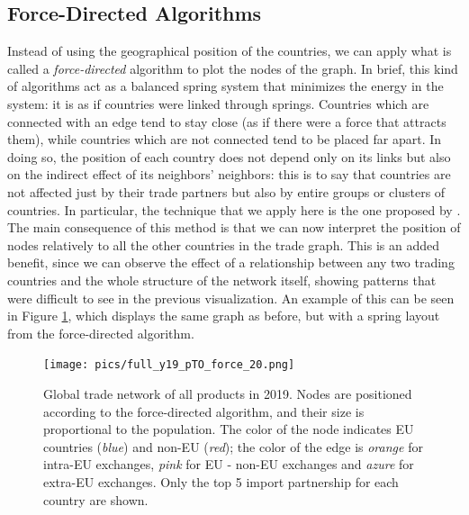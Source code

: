 \subsection{Force-Directed Algorithms}
Instead of using the geographical position of the countries, we can apply what is called a \textit{force-directed} algorithm to plot the nodes of the graph. In brief, this kind of algorithms act as a balanced spring system that minimizes the energy in the system: it is as if countries were linked through springs. Countries which are connected with an edge tend to stay close (as if there were a force that attracts them), while countries which are not connected tend to be placed far apart. In doing so, the position of each country does not depend only on its links but also on the indirect effect of its neighbors' neighbors: this is to say that countries are not affected just by their trade partners but also by entire groups or clusters of countries. In particular, the technique that we apply here is the one proposed by \textcite{fruchterman1991graph}.
The main consequence of this method is that we can now interpret the position of nodes relatively to all the other countries in the trade graph. This is an added benefit, since we can observe the effect of a relationship between any two trading countries and the whole structure of the network itself, showing patterns that were difficult to see in the previous visualization. An example of this can be seen in Figure \ref{fig:forcedir}, which displays the same graph as before, but with a spring layout from the force-directed algorithm.
\begin{figure}
    \centering
    \texttt{[image: pics/full\_y19\_pTO\_force\_20.png]}
    \caption[Global trade network of all products in 2019.]{Global trade network of all products in 2019. Nodes are positioned according to the force-directed algorithm, and their size is proportional to the population. The color of the node indicates EU countries (\textit{blue}) and non-EU (\textit{red}); the color of the edge is \textit{orange} for intra-EU exchanges, \textit{pink} for EU - non-EU exchanges and \textit{azure} for extra-EU exchanges. Only the top 5 import partnership for each country are shown.}
    \label{fig:forcedir}
\end{figure}
